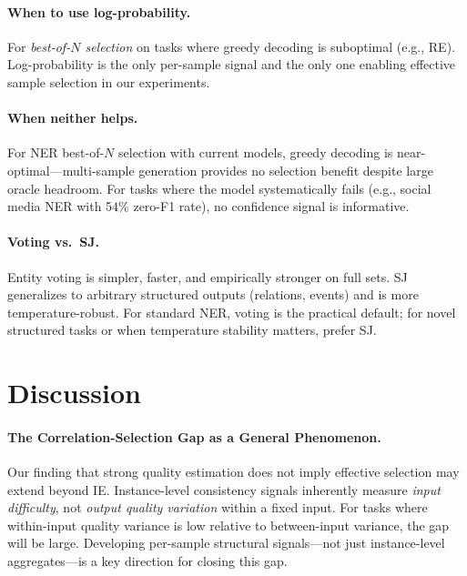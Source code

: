 \documentclass[11pt,a4paper]{article}
\begin{document}
\paragraph{When to use log-probability.}
For \emph{best-of-$N$ selection} on tasks where greedy decoding is suboptimal (e.g., RE).
Log-probability is the only per-sample signal and the only one enabling effective sample selection in our experiments.

\paragraph{When neither helps.}
For NER best-of-$N$ selection with current models, greedy decoding is near-optimal---multi-sample generation provides no selection benefit despite large oracle headroom.
For tasks where the model systematically fails (e.g., social media NER with 54\% zero-F1 rate), no confidence signal is informative.

\paragraph{Voting vs.\ SJ.}
Entity voting is simpler, faster, and empirically stronger on full sets.
SJ generalizes to arbitrary structured outputs (relations, events) and is more temperature-robust.
For standard NER, voting is the practical default; for novel structured tasks or when temperature stability matters, prefer SJ.

\section{Discussion}
\label{sec:discussion}

\paragraph{The Correlation-Selection Gap as a General Phenomenon.}
Our finding that strong quality estimation does not imply effective selection may extend beyond IE.
Instance-level consistency signals inherently measure \emph{input difficulty}, not \emph{output quality variation} within a fixed input.
For tasks where within-input quality variance is low relative to between-input variance, the gap will be large.
Developing per-sample structural signals---not just instance-level aggregates---is a key direction for closing this gap.
\end{document}
